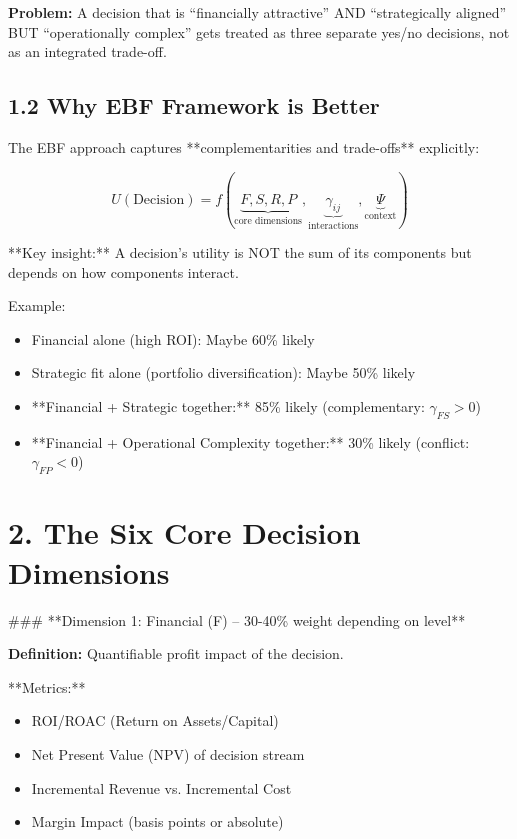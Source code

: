 \documentclass[11pt]{article}
\begin{document}
\textbf{Problem:} A decision that is ``financially attractive'' AND ``strategically aligned'' BUT ``operationally complex'' gets treated as three separate yes/no decisions, not as an integrated trade-off.

\subsection{1.2 Why EBF Framework is Better}

The EBF approach captures **complementarities and trade-offs** explicitly:

\begin{equation}
U(\text{Decision}) = f(\underbrace{F, S, R, P}_{\text{core dimensions}}, \underbrace{\gamma_{ij}}_{\text{interactions}}, \underbrace{\Psi}_{\text{context}})
\end{equation}

**Key insight:** A decision's utility is NOT the sum of its components but depends on how components interact.

Example:
\begin{itemize}
\item Financial alone (high ROI): Maybe 60\% likely
\item Strategic fit alone (portfolio diversification): Maybe 50\% likely
\item **Financial + Strategic together:** 85\% likely (complementary: $\gamma_{FS} > 0$)
\item **Financial + Operational Complexity together:** 30\% likely (conflict: $\gamma_{FP} < 0$)
\end{itemize}

\section{2. The Six Core Decision Dimensions}

### **Dimension 1: Financial (F) – 30-40\% weight depending on level**

\textbf{Definition:} Quantifiable profit impact of the decision.

**Metrics:**
\begin{itemize}
\item ROI/ROAC (Return on Assets/Capital)
\item Net Present Value (NPV) of decision stream
\item Incremental Revenue vs. Incremental Cost
\item Margin Impact (basis points or absolute)
\end{itemize}
\end{document}
